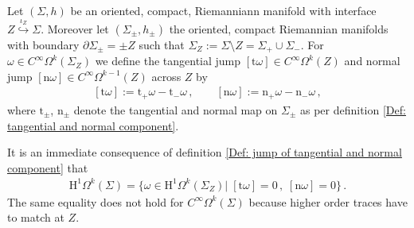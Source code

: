\begin{Definition}\label{Def: jump of tangential and normal component}
	Let $(\Sigma,h)$ be an oriented, compact, Riemanniann manifold with interface $Z\stackrel{\iota_Z}{\hookrightarrow}\Sigma$.
	Moreover let $(\Sigma_\pm,h_\pm)$ the oriented, compact Riemannian manifolds with boundary $\partial\Sigma_\pm=\pm Z$ such that $\Sigma_Z:=
	\Sigma\setminus Z=\Sigma_+\cup\Sigma_-$.
	For $\omega\in C^\infty\Omega^k(\Sigma_Z)$ we define the tangential jump $[\mathrm{t}\omega]\in C^\infty\Omega^k(Z)$ and normal jump $[\mathrm{n}\omega]\in C^\infty\Omega^{k-1}(Z)$ across $Z$ by
	\begin{align}\label{Eqn: tangential and normal jump}
		[\mathrm{t}\omega]:=\mathrm{t}_+\omega-\mathrm{t}_-\omega\,,\qquad
		[\mathrm{n}\omega]:=\mathrm{n}_+\omega-\mathrm{n}_-\omega\,,
	\end{align}
	where $\mathrm{t}_\pm$, $\mathrm{n}_\pm$ denote the tangential and normal map on $\Sigma_\pm$ as per definition \ref{Def: tangential and normal component}.
\end{Definition}
\begin{remark}\label{Rmk: spaces with no jumps}
	It is an immediate consequence of definition \ref{Def: jump of tangential and normal component} that
	\begin{align}
		\mathrm{H}^1\Omega^k(\Sigma)=
		\lbrace\omega\in\mathrm{H}^1\Omega^k(\Sigma_Z)|\;[\mathrm{t}\omega]=0\,,\;[\mathrm{n}\omega]=0
		\rbrace\,.
	\end{align}
	The same equality does not hold for $C^\infty\Omega^k(\Sigma)$ because higher order traces have to match at $Z$.
\end{remark}
